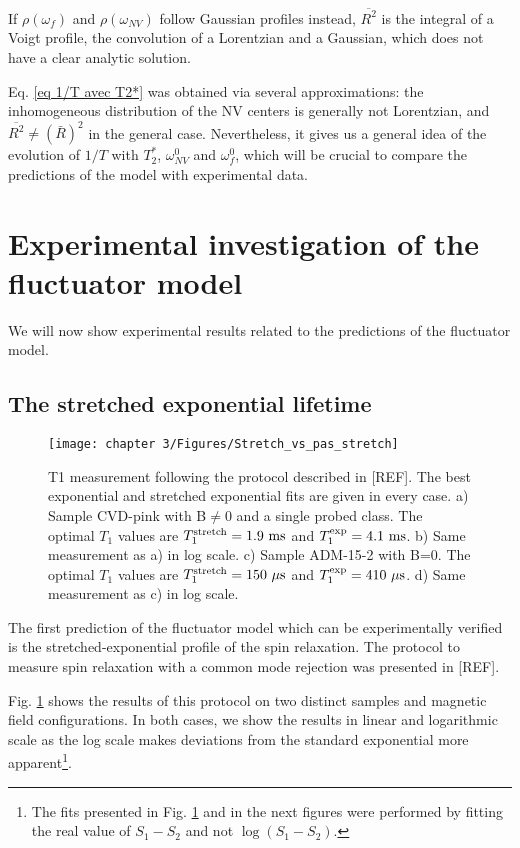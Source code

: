 \documentclass[a4paper, 11pt]{book}
\begin{document}
If $\rho(\omega_{f})$ and $\rho(\omega_{NV})$ follow Gaussian profiles instead, $\overline{R^2}$ is the integral of a Voigt profile, the convolution of a Lorentzian and a Gaussian, which does not have a clear analytic solution.

Eq. \ref{eq 1/T avec T2*} was obtained via several approximations: the inhomogeneous distribution of the NV centers is generally not Lorentzian, and $\overline{R^2} \neq (\bar{R})^2$ in the general case. Nevertheless, it gives us a general idea of the evolution of $1/T$ with $T_2^*$, $\omega_{NV}^0$ and $\omega_{f}^0$, which will be crucial to compare the predictions of the model with experimental data.






\section{Experimental investigation of the fluctuator model}
We will now show experimental results related to the predictions of the fluctuator model.
\subsection{The stretched exponential lifetime}
\begin{figure}[h]
\centering
\texttt{[image: chapter 3/Figures/Stretch\_vs\_pas\_stretch]}
\caption{T1 measurement following the protocol described in [REF]. The best exponential and stretched exponential fits are given in every case. a) Sample CVD-pink with B$\neq$0 and a single  probed class. The optimal $T_1$ values are $T_1^{\rm stretch}=1.9\ \rm ms$ and $T_1^{\rm exp}=4.1\ \rm ms$. b) Same measurement as a) in log scale. c) Sample ADM-15-2 with B=0. The optimal $T_1$ values are $T_1^{\rm stretch}=150\ \mu \rm s$ and $T_1^{\rm exp}=410\ \mu \rm s$. d) Same measurement as c) in log scale.}
\label{stretch_or_not_stretch}
\end{figure}

The first prediction of the fluctuator model which can be experimentally verified is the stretched-exponential profile of the spin relaxation. The protocol to measure spin relaxation with a common mode rejection was presented in [REF]. 

Fig. \ref{stretch_or_not_stretch} shows the results of this protocol on two distinct samples and magnetic field configurations. In both cases, we show the results in linear and logarithmic scale as the log scale makes deviations from the standard exponential more apparent\footnote{The fits presented in Fig. \ref{stretch_or_not_stretch} and in the next figures were performed by fitting the real value of $S_1-S_2$ and not $\log(S_1-S_2)$.}.
\end{document}
